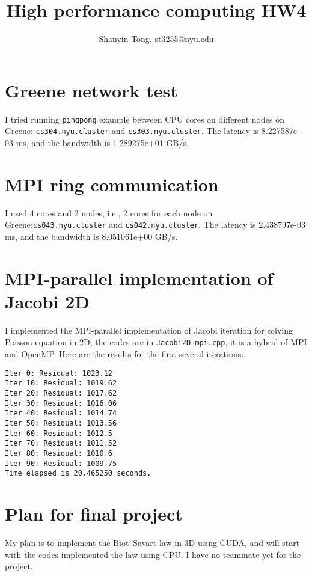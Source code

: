 \documentclass[10pt,a4paper]{article}
\theoremstyle{dotlessP}
\begin{document}
\title{High performance computing HW4}
\author{Shanyin Tong, st3255@nyu.edu}

\maketitle

\section{Greene network test}
I tried running \texttt{pingpong} example between CPU cores on different nodes on Greene: \texttt{cs304.nyu.cluster} and \texttt{cs303.nyu.cluster}. The latency is 8.227587e-03 ms, and the bandwidth is 1.289275e+01 GB/s.

\section{MPI ring communication}
I used 4 cores and 2 nodes, i.e., 2 cores for each node on Greene:\texttt{cs043.nyu.cluster} and \texttt{cs042.nyu.cluster}. The latency is 2.438797e-03 ms, and the bandwidth is 8.051061e+00 GB/s.

\section{MPI-parallel implementation of Jacobi 2D}
I implemented the MPI-parallel implementation of Jacobi iteration for solving Poisson equation in 2D, the codes are in \texttt{Jacobi2D-mpi.cpp}, it is a hybrid of MPI and OpenMP. Here are the results for the first several iterations:
\begin{lstlisting}
Iter 0: Residual: 1023.12
Iter 10: Residual: 1019.62
Iter 20: Residual: 1017.62
Iter 30: Residual: 1016.06
Iter 40: Residual: 1014.74
Iter 50: Residual: 1013.56
Iter 60: Residual: 1012.5
Iter 70: Residual: 1011.52
Iter 80: Residual: 1010.6
Iter 90: Residual: 1009.75
Time elapsed is 20.465250 seconds.
\end{lstlisting}

\section{Plan for final project}
My plan is to implement the Biot–Savart law in 3D using CUDA, and will start with the codes implemented the law using CPU. I have no teammate yet for the project.
\end{document}
